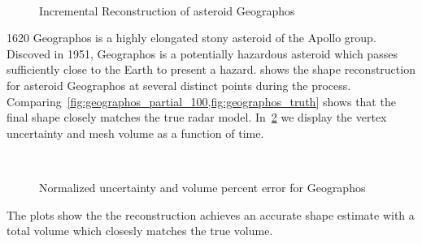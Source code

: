 \begin{figure}[htbp]
    ~
    \caption[Asteroid Geographos Incremental Reconstruction]{Incremental Reconstruction of asteroid Geographos~\label{fig:geographos_reconstruction}}
\end{figure}
\num{1620} Geographos is a highly elongated stony asteroid of the Apollo group.
Discoved in \num{1951}, Geographos is a potentially hazardous asteroid which passes sufficiently close to the Earth to present a hazard.
 shows the shape reconstruction for asteroid Geographos at several distinct points during the process.
Comparing~\cref{fig:geographos_partial_100,fig:geographos_truth} shows that the final shape closely matches the true radar model.
In~\cref{fig:geographos_metrics} we display the vertex uncertainty and mesh volume as a function of time.
\begin{figure}[htbp]
    \centering
    ~
    \caption{Normalized uncertainty and volume percent error for Geographos\label{fig:geographos_metrics}}
\end{figure}
The plots show the the reconstruction achieves an accurate shape estimate with a total volume which closesly matches the true volume.

